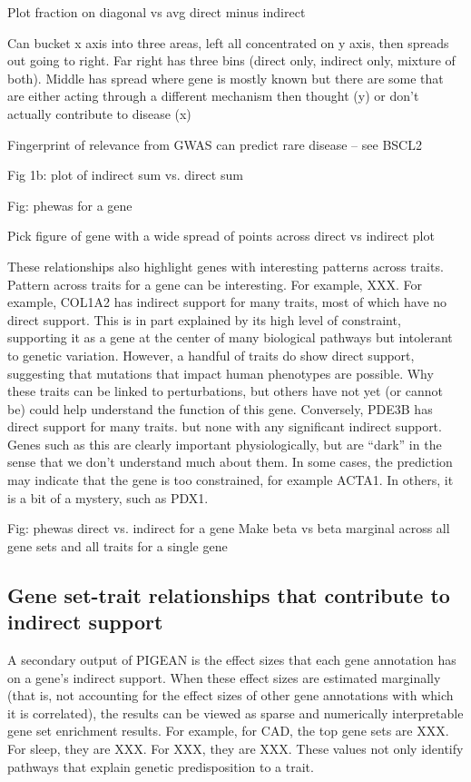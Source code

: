\documentclass[sn-nature,lineno]{sn-jnl}%
\theoremstyle{thmstyleone}%
\theoremstyle{thmstyletwo}%
\theoremstyle{thmstylethree}%
\begin{document}
Plot fraction on diagonal vs avg direct minus indirect

Can bucket x axis into three areas, left all concentrated on y axis, then spreads out going to right. Far right has three bins (direct only, indirect only, mixture of both). Middle has spread where gene is mostly known but there are some that are either acting through a different mechanism then thought (y) or don't actually contribute to disease (x)

Fingerprint of relevance from GWAS can predict rare disease -- see BSCL2


Fig 1b: plot of indirect sum vs. direct sum

Fig: phewas for a gene

Pick figure of gene with a wide spread of points across direct vs indirect plot


These relationships also highlight genes with interesting patterns across traits. Pattern across traits for a gene can be interesting. For example, XXX. For example, COL1A2 has indirect support for many traits, most of which have no direct support. This is in part explained by its high level of constraint, supporting it as a gene at the center of many biological pathways but intolerant to genetic variation. However, a handful of traits do show direct support, suggesting that mutations that impact human phenotypes are possible. Why these traits can be linked to perturbations, but others have not yet (or cannot be) could help understand the function of this gene. Conversely, PDE3B has direct support for many traits. but none with any significant indirect support. Genes such as this are clearly important physiologically, but are ``dark'' in the sense that we don't understand much about them. In some cases, the prediction may indicate that the gene is too constrained, for example ACTA1. In others, it is a bit of a mystery, such as PDX1. 

Fig: phewas direct vs. indirect for a gene Make beta vs beta marginal across all gene sets and all traits for a single gene

\subsection{Gene set-trait relationships that contribute to indirect support}

A secondary output of PIGEAN is the effect sizes that each gene annotation has on a gene's indirect support. When these effect sizes are estimated marginally (that is, not accounting for the effect sizes of other gene annotations with which it is correlated), the results can be viewed as sparse and numerically interpretable gene set enrichment results. For example, for CAD, the top gene sets are XXX. For sleep, they are XXX. For XXX, they are XXX. These values not only identify pathways that explain genetic predisposition to a trait.
\end{document}
